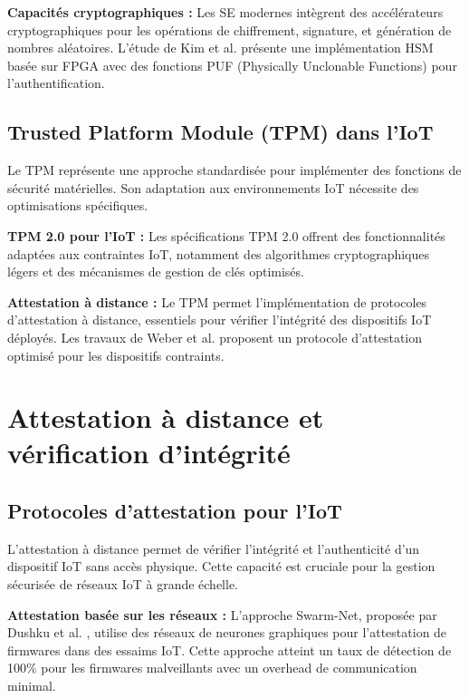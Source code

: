 \textbf{Capacités cryptographiques :} Les SE modernes intègrent des accélérateurs cryptographiques pour les opérations de chiffrement, signature, et génération de nombres aléatoires. L'étude de Kim et al. \cite{Kim2024HighSecurity} présente une implémentation HSM basée sur FPGA avec des fonctions PUF (Physically Unclonable Functions) pour l'authentification.

\subsection{Trusted Platform Module (TPM) dans l'IoT}

Le TPM représente une approche standardisée pour implémenter des fonctions de sécurité matérielles. Son adaptation aux environnements IoT nécessite des optimisations spécifiques.

\textbf{TPM 2.0 pour l'IoT :} Les spécifications TPM 2.0 offrent des fonctionnalités adaptées aux contraintes IoT, notamment des algorithmes cryptographiques légers et des mécanismes de gestion de clés optimisés.

\textbf{Attestation à distance :} Le TPM permet l'implémentation de protocoles d'attestation à distance, essentiels pour vérifier l'intégrité des dispositifs IoT déployés. Les travaux de Weber et al. \cite{Weber2024AttestationConstrained} proposent un protocole d'attestation optimisé pour les dispositifs contraints.

\section{Attestation à distance et vérification d'intégrité}

\subsection{Protocoles d'attestation pour l'IoT}

L'attestation à distance permet de vérifier l'intégrité et l'authenticité d'un dispositif IoT sans accès physique. Cette capacité est cruciale pour la gestion sécurisée de réseaux IoT à grande échelle.

\textbf{Attestation basée sur les réseaux :} L'approche Swarm-Net, proposée par Dushku et al. \cite{Dushku2024SwarmNet}, utilise des réseaux de neurones graphiques pour l'attestation de firmwares dans des essaims IoT. Cette approche atteint un taux de détection de 100\% pour les firmwares malveillants avec un overhead de communication minimal.

